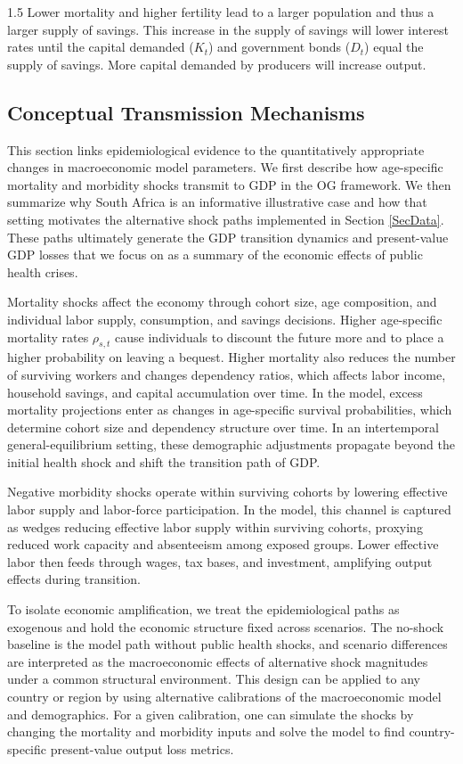\documentclass[letterpaper,12pt]{article}
\theoremstyle{definition}
\begin{document}
\begin{spacing}{1.5}
    Lower mortality and higher fertility lead to a larger population and thus a larger supply of savings. This increase in the supply of savings will lower interest rates until the capital demanded ($K_t$) and government bonds ($D_t$) equal the supply of savings. More capital demanded by producers will increase output.


  \subsection{Conceptual Transmission Mechanisms}

  This section links epidemiological evidence to the quantitatively appropriate changes in macroeconomic model parameters. We first describe how age-specific mortality and morbidity shocks transmit to GDP in the OG framework. We then summarize why South Africa is an informative illustrative case and how that setting motivates the alternative shock paths implemented in Section \ref{SecData}. These paths ultimately generate the GDP transition dynamics and present-value GDP losses that we focus on as a summary of the economic effects of public health crises.

  Mortality shocks affect the economy through cohort size, age composition, and individual labor supply, consumption, and savings decisions. Higher age-specific mortality rates $\rho_{s,t}$ cause individuals to discount the future more and to place a higher probability on leaving a bequest. Higher mortality also reduces the number of surviving workers and changes dependency ratios, which affects labor income, household savings, and capital accumulation over time. In the model, excess mortality projections enter as changes in age-specific survival probabilities, which determine cohort size and dependency structure over time. In an intertemporal general-equilibrium setting, these demographic adjustments propagate beyond the initial health shock and shift the transition path of GDP.

  Negative morbidity shocks operate within surviving cohorts by lowering effective labor supply and labor-force participation. In the model, this channel is captured as wedges reducing effective labor supply within surviving cohorts, proxying reduced work capacity and absenteeism among exposed groups. Lower effective labor then feeds through wages, tax bases, and investment, amplifying output effects during transition.

  To isolate economic amplification, we treat the epidemiological paths as exogenous and hold the economic structure fixed across scenarios. The no-shock baseline is the model path without public health shocks, and scenario differences are interpreted as the macroeconomic effects of alternative shock magnitudes under a common structural environment. This design can be applied to any country or region by using alternative calibrations of the macroeconomic model and demographics. For a given calibration, one can simulate the shocks by changing the mortality and morbidity inputs and solve the model to find country-specific present-value output loss metrics.



\end{spacing}
\end{document}
